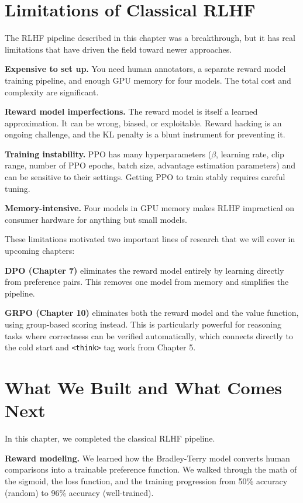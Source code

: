 \begin{chapterenv}
\section{Limitations of Classical RLHF}

The RLHF pipeline described in this chapter was a breakthrough, but it has real limitations that have driven the field toward newer approaches.

\textbf{Expensive to set up.} You need human annotators, a separate reward model training pipeline, and enough GPU memory for four models. The total cost and complexity are significant.

\textbf{Reward model imperfections.} The reward model is itself a learned approximation. It can be wrong, biased, or exploitable. Reward hacking is an ongoing challenge, and the KL penalty is a blunt instrument for preventing it.

\textbf{Training instability.} PPO has many hyperparameters ($\beta$, learning rate, clip range, number of PPO epochs, batch size, advantage estimation parameters) and can be sensitive to their settings. Getting PPO to train stably requires careful tuning.

\textbf{Memory-intensive.} Four models in GPU memory makes RLHF impractical on consumer hardware for anything but small models.

These limitations motivated two important lines of research that we will cover in upcoming chapters:

\textbf{DPO (Chapter 7)} eliminates the reward model entirely by learning directly from preference pairs. This removes one model from memory and simplifies the pipeline.

\textbf{GRPO (Chapter 10)} eliminates both the reward model and the value function, using group-based scoring instead. This is particularly powerful for reasoning tasks where correctness can be verified automatically, which connects directly to the cold start and \texttt{<think>} tag work from Chapter 5.

\section{What We Built and What Comes Next}

In this chapter, we completed the classical RLHF pipeline.

\textbf{Reward modeling.} We learned how the Bradley-Terry model converts human comparisons into a trainable preference function. We walked through the math of the sigmoid, the loss function, and the training progression from 50\% accuracy (random) to 96\% accuracy (well-trained).


\end{chapterenv}
